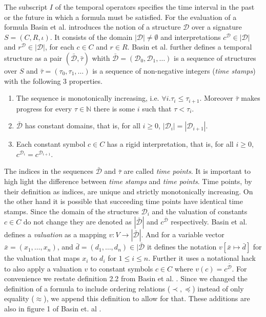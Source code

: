 The subscript $I$ of the temporal operators specifies the time interval in the past or the future in which a formula must be satisfied.
For the evaluation of a formula Basin et al. \cite{Basin2015} introduces the notion of a structure $\mathcal{D}$ over a signature $S=(C,R,\iota)$.
It consists of the domain $| \mathcal{D} | \neq \emptyset$ and interpretations $c^\mathcal{D} \in |\mathcal{D}|$ and $r^\mathcal{D} \in |\mathcal{D}|$, for each $c \in C$ and $r \in R$.
Basin et al. \cite{Basin2015} further defines a temporal structure as a pair $(\bar{\mathcal{D}}, \bar{\tau})$ whith $\bar{\mathcal{D}} = (\mathcal{D}_0, \mathcal{D}_1, \dots)$ is a sequence of structures over $S$ and $\bar{\tau} = (\tau_0, \tau_1, \dots)$ is a sequence of non-negative integers (\textit{time stamps}) with the following 3 properties.
\renewcommand{\labelenumi}{\arabic{enumi}.}
\begin{enumerate}
    \item The sequence is monotonically increasing, i.e. $\forall i . \tau_i \leq \tau_{i+1}$. Moreover $\bar{\tau}$ makes progress for every $\tau \in \mathbb{N}$ there is some $i$ such that $\tau < \tau_i$. 
    \item $\bar{\mathcal{D}}$ has constant domains, that is, for all $i \geq 0$, $|\mathcal{D}_i| = |\mathcal{D}_{i+1}|$.
    \item Each constant symbol $c \in C$ has a rigid interpretation, that is, for all $i \geq 0$, $c^{\mathcal{D}_i} = c^{\mathcal{D}_{i+1}}$.
\end{enumerate}
The indices in the sequences $\bar{\mathcal{D}}$ and $\bar{\tau}$ are called \textit{time points}.
It is important to high light the difference between \textit{time stamps} and \textit{time points}.
Time points, by their definition as indices, are unique and strictly monotonically increasing.
On the other hand it is possible that succeeding time points have identical time stamps.
Since the domain of the structures $\mathcal{D}_i$ and the valuation of constants $c \in C$ do not change they are denoted as $|\bar{\mathcal{D}}|$ and $c^{\bar{\mathcal{D}}}$ respectively.
Basin et al. defines a \textit{valuation} as a mapping $v : V \to |\bar{\mathcal{D}}|$.
And for a variable vector $\bar{x} = (x_1,\dots,x_n)$, and $\bar{d}=(d_1,\dots,d_n) \in |\bar{\mathcal{D}}$ it defines the notation $v[\bar{x} \mapsto \bar{d}]$ for the valuation that maps $x_i$ to $d_i$ for $1 \leq i \leq n$.
Further it uses a notational hack to also apply a valuation $v$ to constant symbols $c \in C$ where $v(c) = c^{\bar{\mathcal{D}}}$.
For convenience we restate definition 2.2 from Basin et al. \cite{Basin2015}.
Since we changed the definition of a formula to include ordering relations ($\prec, \preceq$) instead of only equality ($\approx$), we append this definition to allow for that.
These additions are also in figure 1 of Basin et. al \cite{Basin2020}.

